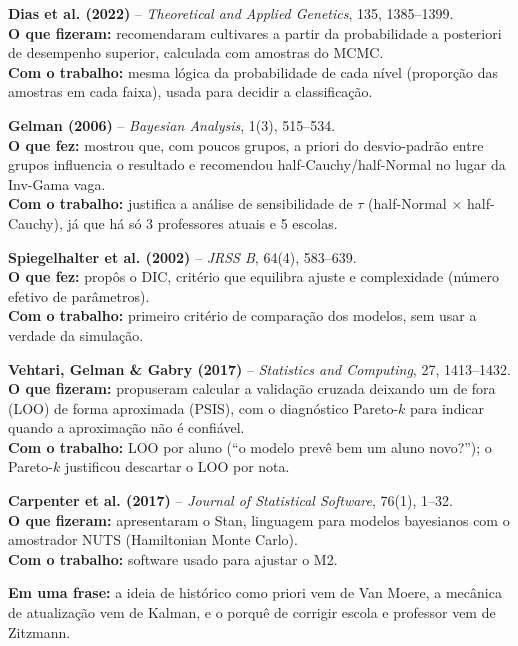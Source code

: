 \documentclass[10pt,a4paper]{article}
\begin{document}
\textbf{Dias et al. (2022)} -- \textit{Theoretical and Applied Genetics}, 135, 1385--1399.\\
\textbf{O que fizeram:} recomendaram cultivares a partir da probabilidade a posteriori de desempenho superior, calculada com amostras do MCMC.\\
\textbf{Com o trabalho:} mesma lógica da probabilidade de cada nível (proporção das amostras em cada faixa), usada para decidir a classificação.

\textbf{Gelman (2006)} -- \textit{Bayesian Analysis}, 1(3), 515--534.\\
\textbf{O que fez:} mostrou que, com poucos grupos, a priori do desvio-padrão entre grupos influencia o resultado e recomendou half-Cauchy/half-Normal no lugar da Inv-Gama vaga.\\
\textbf{Com o trabalho:} justifica a análise de sensibilidade de $\tau$ (half-Normal $\times$ half-Cauchy), já que há só 3 professores atuais e 5 escolas.

\textbf{Spiegelhalter et al. (2002)} -- \textit{JRSS B}, 64(4), 583--639.\\
\textbf{O que fez:} propôs o DIC, critério que equilibra ajuste e complexidade (número efetivo de parâmetros).\\
\textbf{Com o trabalho:} primeiro critério de comparação dos modelos, sem usar a verdade da simulação.

\textbf{Vehtari, Gelman \& Gabry (2017)} -- \textit{Statistics and Computing}, 27, 1413--1432.\\
\textbf{O que fizeram:} propuseram calcular a validação cruzada deixando um de fora (LOO) de forma aproximada (PSIS), com o diagnóstico Pareto-$k$ para indicar quando a aproximação não é confiável.\\
\textbf{Com o trabalho:} LOO por aluno (``o modelo prevê bem um aluno novo?''); o Pareto-$k$ justificou descartar o LOO por nota.

\textbf{Carpenter et al. (2017)} -- \textit{Journal of Statistical Software}, 76(1), 1--32.\\
\textbf{O que fizeram:} apresentaram o Stan, linguagem para modelos bayesianos com o amostrador NUTS (Hamiltonian Monte Carlo).\\
\textbf{Com o trabalho:} software usado para ajustar o M2.

\vfill
{\small\textbf{Em uma frase:} a ideia de histórico como priori vem de Van Moere, a mecânica de atualização vem de Kalman, e o porquê de corrigir escola e professor vem de Zitzmann.}
\end{document}
